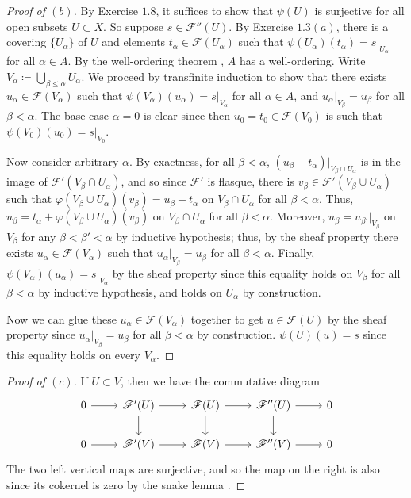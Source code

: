 \documentclass[10pt]{article}
\theoremstyle{definition}
\theoremstyle{remark}
\numberwithin{equation}{section}
\numberwithin{figure}{subsubsection}
\begin{document}
\begin{proof}[Proof of $(b)$]
  By Exercise $1.8$, it suffices to show that $\psi(U)$ is surjective for all
  open subsets $U \subset X$. So suppose $s \in \mathscr{F}''(U)$. By Exercise $1.3(a)$, there is a covering $\{U_\alpha\}$ of $U$ and elements $t_\alpha \in \mathscr{F}(U_\alpha)$ such that $\psi(U_\alpha)(t_\alpha) = s\vert_{U_\alpha}$ for all $\alpha \in A$. By the well-ordering theorem \cite[p.~253]{Sho01}, $A$ has a well-ordering. Write $V_\alpha \coloneqq \bigcup_{\beta \le \alpha} U_\alpha$. We proceed by transfinite induction \cite[p.~247]{Sho01} to show that there exists $u_\alpha \in \mathscr{F}(V_\alpha)$ such that $\psi(V_\alpha)(u_\alpha) = s\vert_{V_\alpha}$ for all $\alpha \in A$, and $u_\alpha\vert_{V_\beta} = u_\beta$ for all $\beta < \alpha$. The base case $\alpha = 0$ is clear since then $u_0 = t_0 \in \mathscr{F}(V_0)$ is such that $\psi(V_0)(u_0) = s\vert_{V_0}$.
  \par Now consider arbitrary $\alpha$. By exactness, for all $\beta < \alpha$, $(u_\beta - t_\alpha)\vert_{V_\beta\cap U_\alpha}$ is in the image of $\mathscr{F}'(V_\beta \cap U_\alpha)$, and so since $\mathscr{F}'$ is flasque, there is $v_\beta \in \mathscr{F}'(V_\beta \cup U_\alpha)$ such that $\varphi(V_\beta \cup U_\alpha)(v_\beta) = u_\beta - t_\alpha$ on $V_\beta \cap U_\alpha$ for all $\beta < \alpha$. Thus, $u_\beta = t_\alpha + \varphi(V_\beta \cup U_\alpha)(v_\beta)$ on $V_\beta \cap U_\alpha$ for all $\beta < \alpha$. Moreover, $u_\beta = u_{\beta'}\vert_{V_{\beta}}$ on $V_\beta$ for any $\beta < \beta' < \alpha$ by inductive hypothesis; thus, by the sheaf property there exists $u_\alpha \in \mathscr{F}(V_\alpha)$ such that $u_\alpha\vert_{V_\beta} = u_\beta$ for all $\beta < \alpha$. Finally, $\psi(V_\alpha)(u_\alpha) = s\vert_{V_\alpha}$ by the sheaf property since this equality holds on $V_\beta$ for all $\beta < \alpha$ by inductive hypothesis, and holds on $U_\alpha$ by construction.
  \par Now we can glue these $u_\alpha \in \mathscr{F}(V_\alpha)$ together to get $u \in \mathscr{F}(U)$ by the sheaf property since $u_\alpha\vert_{V_\beta} = u_\beta$ for all $\beta < \alpha$ by construction. $\psi(U)(u) = s$ since this equality holds on every $V_\alpha$.
\end{proof}
\begin{proof}[Proof of $(c)$]
  If $U \subset V$, then we have the commutative diagram
  \begin{equation*}
    \begin{tikzcd}
      0 \rar & \mathscr{F}'(U) \rar\dar & \mathscr{F}(U) \rar\dar & \mathscr{F}''(U) \rar\dar & 0\\
      0 \rar & \mathscr{F}'(V) \rar & \mathscr{F}(V) \rar & \mathscr{F}''(V) \rar & 0
    \end{tikzcd}
  \end{equation*}
  The two left vertical maps are surjective, and so the map on the right is also since its cokernel is zero by the snake lemma \cite[Prop.~2.10]{AM69}.
\end{proof}
\end{document}

